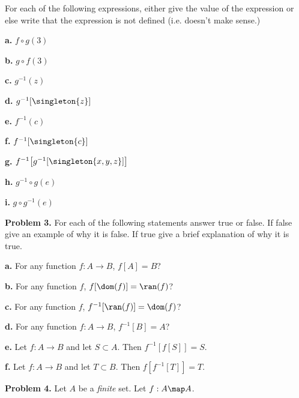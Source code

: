 \documentclass[oneside,12pt]{amsart}
\begin{document}
For each of the following expressions, either give the value of the expression
or else write that the expression is not defined (i.e. doesn't make sense.)

\textbf{a.} $f\circ g (3)$

\medskip

\textbf{b.} $g\circ f (3)$

\medskip

\textbf{c.} $g^{-1}(z)$

\medskip

\textbf{d.} $g^{-1}[\singleton{z}]$

\medskip

\textbf{e.} $f^{-1}(c)$

\medskip

\textbf{f.} $f^{-1}[\singleton{c}]$

\medskip

\textbf{g.} $f^{-1}\big[g^{-1}[\singleton{x, y, z}]\big]$

\medskip

\textbf{h.} $g^{-1} \circ g (e)$

\medskip

\textbf{i.} $g \circ g^{-1} (e)$

\bigskip

\textbf{Problem 3.} For each of the following statements answer true or
false. If false give an example of why it is false. If true give a brief
explanation of why it is true.

\smallskip

\textbf{a.} For any function $f:A\to B$, $f[A] = B$?

\bigskip
\bigskip

\textbf{b.} For any function $f$, $f[\dom(f)] = \ran(f)$?

\bigskip
\bigskip

\textbf{c.} For any function $f$, $f^{-1}[\ran(f)] = \dom(f)$?

\bigskip
\bigskip

\textbf{d.} For any function  $f:A\to B$, $f^{-1}[B] = A$?

\bigskip
\bigskip

\textbf{e.} Let $f:A\to B$ and let $S\subset A$. Then $f^{-1}[f[S]] = S$.

\bigskip
\bigskip

\textbf{f.} Let $f:A\to B$ and let $T\subset B$. Then $f[f^{-1}[T]] = T$.

\bigskip

\textbf{Problem 4.} Let $A$ be a \emph{finite} set.
Let $f : A \map A$.
\end{document}
